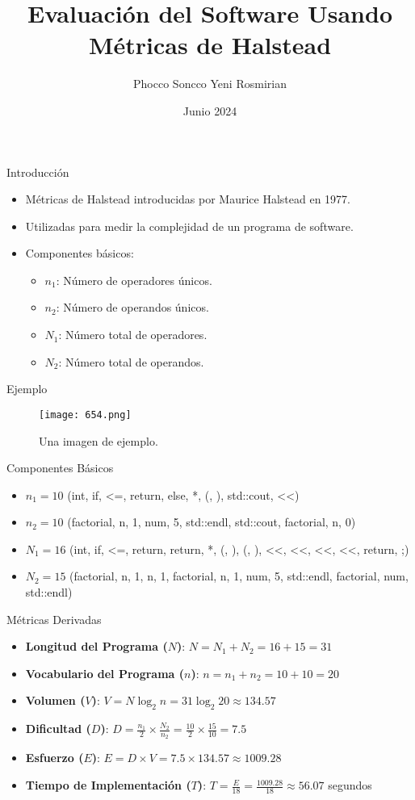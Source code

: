 \documentclass{beamer}
\title{Evaluación del Software Usando Métricas de Halstead}
\author{Phocco Soncco Yeni Rosmirian}
\date{Junio 2024}
\begin{document}
\frame{\titlepage}

\begin{frame}{Introducción}
\begin{itemize}
    \item Métricas de Halstead introducidas por Maurice Halstead en 1977.
    \item Utilizadas para medir la complejidad de un programa de software.
    \item Componentes básicos:
    \begin{itemize}
        \item $n_1$: Número de operadores únicos.
        \item $n_2$: Número de operandos únicos.
        \item $N_1$: Número total de operadores.
        \item $N_2$: Número total de operandos.
    \end{itemize}
\end{itemize}
\end{frame}

\begin{frame}{Ejemplo}
\begin{figure}[h]
    \centering
    \texttt{[image: 654.png]}
    \caption{Una imagen de ejemplo.}
    \label{fig:ejemplo}
\end{figure}
\end{frame}

\begin{frame}{Componentes Básicos}
\begin{itemize}
    \item $n_1 = 10$ (int, if, <=, return, else, *, (, ), std::cout, <<)
    \item $n_2 = 10$ (factorial, n, 1, num, 5, std::endl, std::cout, factorial, n, 0)
    \item $N_1 = 16$ (int, if, <=, return, return, *, (, ), (, ), <<, <<, <<, <<, return, ;)
    \item $N_2 = 15$ (factorial, n, 1, n, 1, factorial, n, 1, num, 5, std::endl, factorial, num, std::endl)
\end{itemize}
\end{frame}

\begin{frame}{Métricas Derivadas}
\begin{itemize}
    \item \textbf{Longitud del Programa ($N$)}: $N = N_1 + N_2 = 16 + 15 = 31$
    \item \textbf{Vocabulario del Programa ($n$)}: $n = n_1 + n_2 = 10 + 10 = 20$
    \item \textbf{Volumen ($V$)}: $V = N \log_2 n = 31 \log_2 20 \approx 134.57$
    \item \textbf{Dificultad ($D$)}: $D = \frac{n_1}{2} \times \frac{N_2}{n_2} = \frac{10}{2} \times \frac{15}{10} = 7.5$
    \item \textbf{Esfuerzo ($E$)}: $E = D \times V = 7.5 \times 134.57 \approx 1009.28$
    \item \textbf{Tiempo de Implementación ($T$)}: $T = \frac{E}{18} = \frac{1009.28}{18} \approx 56.07$ segundos
\end{itemize}
\end{frame}
\end{document}
